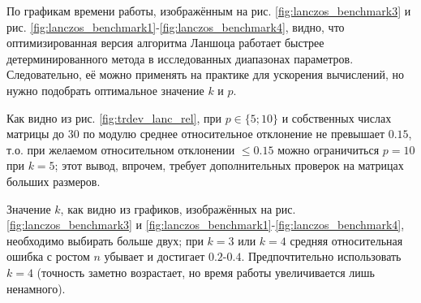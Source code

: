 По графикам времени работы, изображённым на рис. \ref{fig:lanczos_benchmark3} и рис. \ref{fig:lanczos_benchmark1}-\ref{fig:lanczos_benchmark4}, видно, что оптимизированная версия алгоритма Ланшоца работает быстрее детерминированного метода в исследованных диапазонах параметров.
Следовательно, её можно применять на практике для ускорения вычислений, но нужно подобрать оптимальное значение $ k $ и $ p $.

Как видно из рис. \ref{fig:trdev_lanc_rel}, при $ p \in \{ 5; 10 \} $ и собственных числах матрицы до $ 30 $ по модулю среднее относительное отклонение не превышает $ 0.15 $, т.о. при желаемом относительном отклонении $ \le 0.15 $ можно ограничиться $ p=10 $ при $ k=5 $; этот вывод, впрочем, требует дополнительных проверок на матрицах больших размеров.

Значение $ k $, как видно из графиков, изображённых на рис. \ref{fig:lanczos_benchmark3} и \ref{fig:lanczos_benchmark1}-\ref{fig:lanczos_benchmark4}, необходимо выбирать больше двух; при $ k=3 $ или $ k=4 $ средняя относительная ошибка с ростом $ n $ убывает и достигает $ 0.2 $-$0.4$.
Предпочтительно использовать $ k=4 $ (точность заметно возрастает, но время работы увеличивается лишь ненамного).
